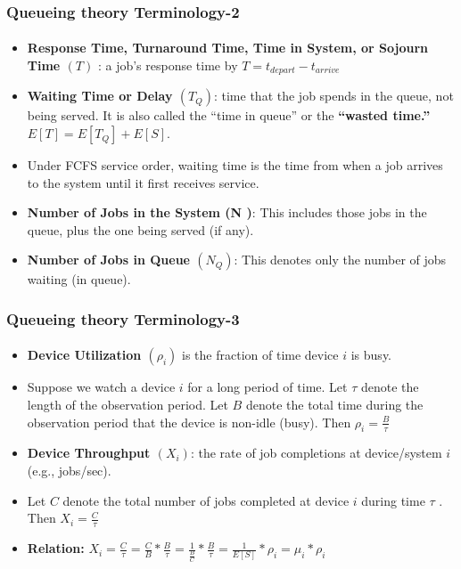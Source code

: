 \documentclass{beamer}
\begin{document}
\begin{frame}
    \frametitle{Queueing theory Terminology-2}
    \framesubtitle{\textbf{\textit{}}}
	\begin{itemize}
		\item 	\textbf{Response Time, Turnaround Time, Time in System, or 					Sojourn Time $( T )$ }: a job’s response time by 
			$T = t_{depart} - {t}_{arrive}$
		\item \textbf{Waiting Time or Delay $(T_Q )$}: time that the job spends in the queue, not being served. It is also called the “time in queue” or the \textbf{“wasted time.” }
		$E [T ] = E [T_Q ] + E [S]$. 
		\item Under FCFS service order, waiting time is  the time from when a job arrives to the system until it first receives service.
	\item \textbf{Number of Jobs in the System (N )}: This includes those jobs in the queue, plus the one being served (if any).
	\item \textbf{Number of Jobs in Queue $(N_Q )$}: This denotes only the number of jobs waiting (in
queue).
	  
	\end{itemize}	    
    
\end{frame}

\begin{frame}
    \frametitle{Queueing theory Terminology-3}
    \framesubtitle{\textbf{\textit{}}}
	\begin{itemize}
		\item \textbf{Device Utilization $(\rho_i )$} is the fraction of time 				device $i$ is busy. 
		\item Suppose we watch a device $  i$ for a long period of time. Let $ \tau $  denote the length of the
observation period. Let $B$ denote the total time during the observation period that the device is non-idle (busy). Then $\rho_i =  \frac{B}{\tau}$

	\item \textbf{Device Throughput $(X_i )$}: the rate of job completions at device/system $i$ (e.g., jobs/sec). 
	\item Let $C$ denote the total number of jobs completed at device $i$ during time $ \tau $ . Then $X_i = \frac{C}{\tau}$
	\item \textbf{Relation:}
$X_i = \frac{C}{\tau} = \frac{C}{B} * \frac{B}{\tau} = \frac{1}{\frac{B}{C}} * \frac{B}{\tau} = \frac{1}{E[S]} * \rho_i = \mu_i * \rho_i  $
	  
	\end{itemize}	    
    
\end{frame}
\end{document}
